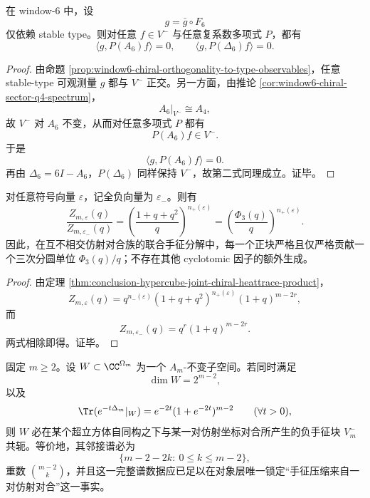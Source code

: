 \begin{theorem}\label{thm:conclusion-window6-stabletype-blind-to-chiral-functional-calculus}
在 window-\(6\) 中，设
\[
g=\bar g\circ F_6
\]
仅依赖 stable type。则对任意 \(f\in V^-\) 与任意复系数多项式 \(P\)，都有
\[
\langle g,P(A_6)f\rangle=0,
\qquad
\langle g,P(\Delta_6)f\rangle=0.
\]
\end{theorem}
\begin{proof}
由命题 \ref{prop:window6-chiral-orthogonality-to-type-observables}，任意 stable-type 可观测量 \(g\) 都与 \(V^-\) 正交。另一方面，由推论 \ref{cor:window6-chiral-sector-q4-spectrum}，
\[
A_6|_{V^-}\cong A_4,
\]
故 \(V^-\) 对 \(A_6\) 不变，从而对任意多项式 \(P\) 都有
\[
P(A_6)f\in V^-.
\]
于是
\[
\langle g,P(A_6)f\rangle=0.
\]
再由 \(\Delta_6=6I-A_6\)，\(P(\Delta_6)\) 同样保持 \(V^-\)，故第二式同理成立。证毕。
\end{proof}

\begin{theorem}\label{thm:conclusion-hypercube-pairwise-cyclotomic-quantization}
对任意符号向量 \(\varepsilon\)，记全负向量为 \(\varepsilon_-\)。则有
\[
\frac{Z_{m,\varepsilon}(q)}{Z_{m,\varepsilon_-}(q)}
=
\left(\frac{1+q+q^2}{q}\right)^{n_+(\varepsilon)}
=
\left(\frac{\Phi_3(q)}{q}\right)^{n_+(\varepsilon)}.
\]
因此，在互不相交仿射对合族的联合手征分解中，每一个正块严格且仅严格贡献一个三次分圆单位 \(\Phi_3(q)/q\)；不存在其他 cyclotomic 因子的额外生成。
\end{theorem}
\begin{proof}
由定理 \ref{thm:conclusion-hypercube-joint-chiral-heattrace-product}，
\[
Z_{m,\varepsilon}(q)
=
q^{n_-(\varepsilon)}(1+q+q^2)^{n_+(\varepsilon)}(1+q)^{m-2r},
\]
而
\[
Z_{m,\varepsilon_-}(q)
=
q^r(1+q)^{m-2r}.
\]
两式相除即得。证毕。
\end{proof}

\begin{conjecture}[单对合手征块的谱唯一性]\label{conj:conclusion-single-involution-chiral-block-spectral-uniqueness}
固定 \(m\ge 2\)。设 \(W\subset \CC^{\Omega_m}\) 为一个 \(A_m\)-不变子空间。若同时满足
\[
\dim W=2^{m-2},
\]
以及
\[
\Tr(e^{-t\Delta_m}|_W)=e^{-2t}(1+e^{-2t})^{m-2}
\qquad(\forall t>0),
\]
则 \(W\) 必在某个超立方体自同构之下与某一对仿射坐标对合所产生的负手征块 \(V_m^-\) 共轭。等价地，其邻接谱必为
\[
\{m-2-2k:\ 0\le k\le m-2\},
\]
重数 \(\binom{m-2}{k}\)，并且这一完整谱数据应已足以在对象层唯一锁定“手征压缩来自一对仿射对合”这一事实。
\end{conjecture}
